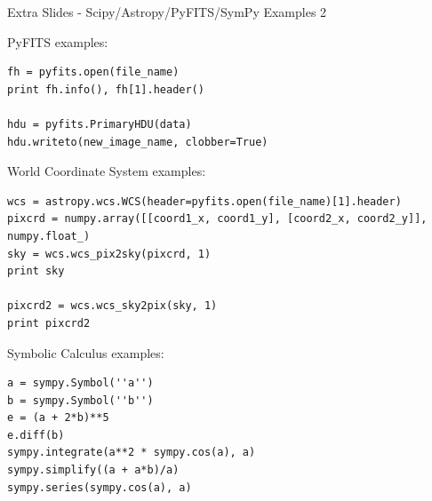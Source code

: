 \documentclass{beamer}
\begin{document}
\begin{frame}[fragile]{Extra Slides - Scipy/Astropy/PyFITS/SymPy Examples 2}
  \fontsize{6pt}{6}\selectfont
  \begin{block}{PyFITS examples:}
  \begin{lstlisting}
fh = pyfits.open(file_name)
print fh.info(), fh[1].header()

hdu = pyfits.PrimaryHDU(data)
hdu.writeto(new_image_name, clobber=True) 
  \end{lstlisting}
  \end{block} 
  \begin{block}{World Coordinate System examples:}
  \begin{lstlisting}
wcs = astropy.wcs.WCS(header=pyfits.open(file_name)[1].header)
pixcrd = numpy.array([[coord1_x, coord1_y], [coord2_x, coord2_y]], numpy.float_)
sky = wcs.wcs_pix2sky(pixcrd, 1)
print sky

pixcrd2 = wcs.wcs_sky2pix(sky, 1)
print pixcrd2
  \end{lstlisting}
  \end{block}
  \begin{block}{Symbolic Calculus examples:}
  \begin{lstlisting}
a = sympy.Symbol(''a'')
b = sympy.Symbol(''b'')
e = (a + 2*b)**5
e.diff(b)
sympy.integrate(a**2 * sympy.cos(a), a)
sympy.simplify((a + a*b)/a)
sympy.series(sympy.cos(a), a)
  \end{lstlisting}
  \end{block}
\end{frame}
\end{document}

